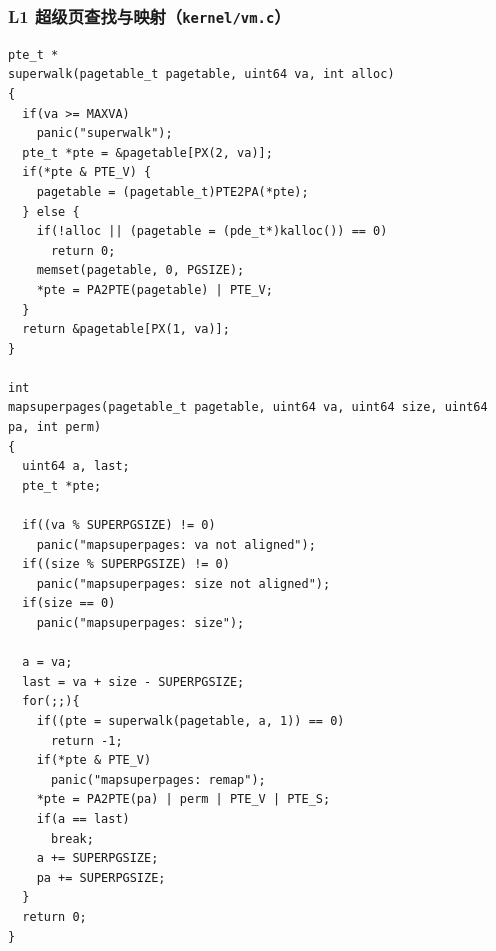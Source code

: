 \documentclass[12pt, a4paper]{ctexart}
\begin{document}
\subsubsection{L1 超级页查找与映射（\texttt{kernel/vm.c}）}
\begin{lstlisting}[caption={\texttt{superwalk}、\texttt{mapsuperpages} 与 \texttt{walkaddr} 实现}]
pte_t *
superwalk(pagetable_t pagetable, uint64 va, int alloc)
{
  if(va >= MAXVA)
    panic("superwalk");
  pte_t *pte = &pagetable[PX(2, va)];
  if(*pte & PTE_V) {
    pagetable = (pagetable_t)PTE2PA(*pte);
  } else {
    if(!alloc || (pagetable = (pde_t*)kalloc()) == 0)
      return 0;
    memset(pagetable, 0, PGSIZE);
    *pte = PA2PTE(pagetable) | PTE_V;
  }
  return &pagetable[PX(1, va)];
}

int
mapsuperpages(pagetable_t pagetable, uint64 va, uint64 size, uint64 pa, int perm)
{
  uint64 a, last;
  pte_t *pte;

  if((va % SUPERPGSIZE) != 0)
    panic("mapsuperpages: va not aligned");
  if((size % SUPERPGSIZE) != 0)
    panic("mapsuperpages: size not aligned");
  if(size == 0)
    panic("mapsuperpages: size");

  a = va;
  last = va + size - SUPERPGSIZE;
  for(;;){
    if((pte = superwalk(pagetable, a, 1)) == 0)
      return -1;
    if(*pte & PTE_V)
      panic("mapsuperpages: remap");
    *pte = PA2PTE(pa) | perm | PTE_V | PTE_S;
    if(a == last)
      break;
    a += SUPERPGSIZE;
    pa += SUPERPGSIZE;
  }
  return 0;
}
\end{lstlisting}
\end{document}
